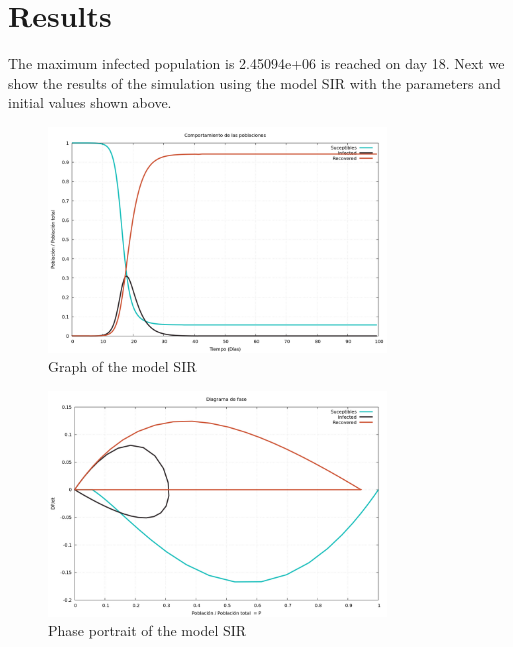 \documentclass{article}
\begin{document}
\section*{Results}
The maximum infected population is 2.45094e+06 is reached on day 18.
Next we show the results of the simulation using the model SIR with the parameters and initial values shown above.
\begin{figure}[H]
\centering
\includegraphics[width=0.8\textwidth]{./data/Proyecto3/graph-SIR.png}
\caption{Graph of the model SIR}
\end{figure}
\begin{figure}[H]
\centering
\includegraphics[width=0.8\textwidth]{./data/Proyecto3/phase-SIR.png}
\caption{Phase portrait of the model SIR}
\end{figure}
\end{document}

